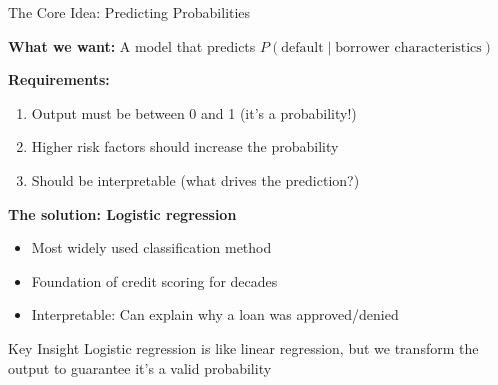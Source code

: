 \documentclass[10pt]{beamer}
\begin{document}
\begin{frame}{The Core Idea: Predicting Probabilities}

  \textbf{What we want:} A model that predicts $P(\text{default} \mid \text{borrower characteristics})$

  \vspace{1em}
  \textbf{Requirements:}
  \begin{enumerate}
    \item Output must be between 0 and 1 (it's a probability!)
    \item Higher risk factors should increase the probability
    \item Should be interpretable (what drives the prediction?)
  \end{enumerate}

  \vspace{1em}
  \textbf{The solution: Logistic regression}
  \begin{itemize}
    \item Most widely used classification method
    \item Foundation of credit scoring for decades
    \item Interpretable: Can explain why a loan was approved/denied
  \end{itemize}

  \vspace{0.5em}
  \begin{block}{Key Insight}
    Logistic regression is like linear regression, but we transform the output to guarantee it's a valid probability
  \end{block}
\end{frame}

\end{document}
